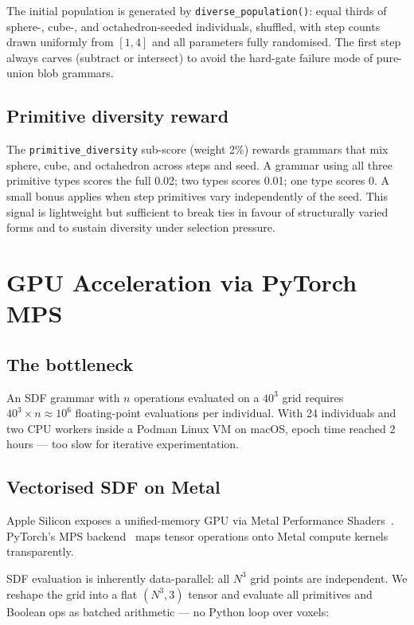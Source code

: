 \documentclass[11pt, a4paper]{article}
\newcommand{\code}[1]{\texttt{#1}}
\begin{document}
The initial population is generated by \code{diverse\_population()}: equal
thirds of sphere-, cube-, and octahedron-seeded individuals, shuffled, with
step counts drawn uniformly from $[1,4]$ and all parameters fully randomised.
The first step always carves (subtract or intersect) to avoid the hard-gate
failure mode of pure-union blob grammars.

\subsection{Primitive diversity reward}
\label{subsec:diversity}

The \code{primitive\_diversity} sub-score (weight 2\%) rewards grammars that
mix sphere, cube, and octahedron across steps and seed.
A grammar using all three primitive types scores the full 0.02; two types
scores 0.01; one type scores 0.
A small bonus applies when step primitives vary independently of the seed.
This signal is lightweight but sufficient to break ties in favour of
structurally varied forms and to sustain diversity under selection pressure.

\section{GPU Acceleration via PyTorch MPS}
\label{sec:metal}

\subsection{The bottleneck}
\label{subsec:bottleneck}

An SDF grammar with $n$ operations evaluated on a $40^3$ grid requires
$40^3 \times n \approx 10^6$ floating-point evaluations per individual.
With 24 individuals and two CPU workers inside a Podman Linux VM on macOS,
epoch time reached 2 hours — too slow for iterative experimentation.

\subsection{Vectorised SDF on Metal}
\label{subsec:mps}

Apple Silicon exposes a unified-memory GPU via Metal Performance
Shaders~\cite{apple_mps}.
PyTorch's MPS backend~\cite{pytorch2019} maps tensor operations onto Metal
compute kernels transparently.

SDF evaluation is inherently data-parallel: all $N^3$ grid points are
independent. We reshape the grid into a flat $(N^3, 3)$ tensor and evaluate
all primitives and Boolean ops as batched arithmetic — no Python loop over
voxels:
\end{document}
